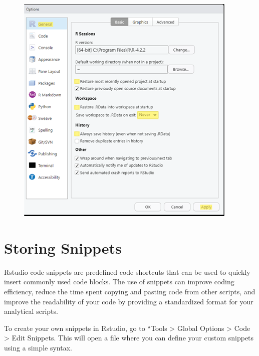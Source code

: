 \documentclass[
  letterpaper,
  DIV=11,
  numbers=noendperiod]{scrreprt}
\begin{document}
\begin{figure}

{\centering \includegraphics{./images/r_setup-global-options.png}

}

\end{figure}

\hypertarget{storing-snippets}{%
\section{Storing Snippets}\label{storing-snippets}}

Rstudio code snippets are predefined code shortcuts that can be used to
quickly insert commonly used code blocks. The use of snippets can
improve coding efficiency, reduce the time spent copying and pasting
code from other scripts, and improve the readability of your code by
providing a standardized format for your analytical scripts.

To create your own snippets in Rstudio, go to ``Tools \textgreater{}
Global Options \textgreater{} Code \textgreater{} Edit Snippets. This
will open a file where you can define your custom snippets using a
simple syntax.
\end{document}

